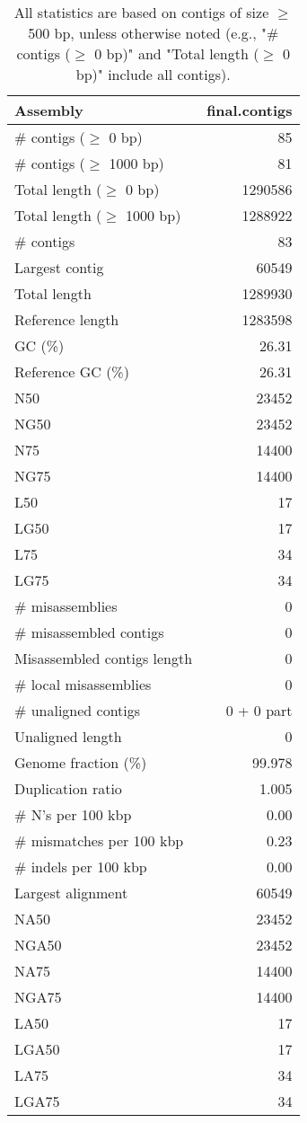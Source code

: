 \documentclass[12pt,a4paper]{article}
\begin{document}
\begin{table}[ht]
\begin{center}
\caption{All statistics are based on contigs of size $\geq$ 500 bp, unless otherwise noted (e.g., "\# contigs ($\geq$ 0 bp)" and "Total length ($\geq$ 0 bp)" include all contigs).}
\begin{tabular}{|l*{1}{|r}|}
\hline
Assembly & final.contigs \\ \hline
\# contigs ($\geq$ 0 bp) & 85 \\ \hline
\# contigs ($\geq$ 1000 bp) & 81 \\ \hline
Total length ($\geq$ 0 bp) & 1290586 \\ \hline
Total length ($\geq$ 1000 bp) & 1288922 \\ \hline
\# contigs & 83 \\ \hline
Largest contig & 60549 \\ \hline
Total length & 1289930 \\ \hline
Reference length & 1283598 \\ \hline
GC (\%) & 26.31 \\ \hline
Reference GC (\%) & 26.31 \\ \hline
N50 & 23452 \\ \hline
NG50 & 23452 \\ \hline
N75 & 14400 \\ \hline
NG75 & 14400 \\ \hline
L50 & 17 \\ \hline
LG50 & 17 \\ \hline
L75 & 34 \\ \hline
LG75 & 34 \\ \hline
\# misassemblies & 0 \\ \hline
\# misassembled contigs & 0 \\ \hline
Misassembled contigs length & 0 \\ \hline
\# local misassemblies & 0 \\ \hline
\# unaligned contigs & 0 + 0 part \\ \hline
Unaligned length & 0 \\ \hline
Genome fraction (\%) & 99.978 \\ \hline
Duplication ratio & 1.005 \\ \hline
\# N's per 100 kbp & 0.00 \\ \hline
\# mismatches per 100 kbp & 0.23 \\ \hline
\# indels per 100 kbp & 0.00 \\ \hline
Largest alignment & 60549 \\ \hline
NA50 & 23452 \\ \hline
NGA50 & 23452 \\ \hline
NA75 & 14400 \\ \hline
NGA75 & 14400 \\ \hline
LA50 & 17 \\ \hline
LGA50 & 17 \\ \hline
LA75 & 34 \\ \hline
LGA75 & 34 \\ \hline
\end{tabular}
\end{center}
\end{table}
\end{document}
